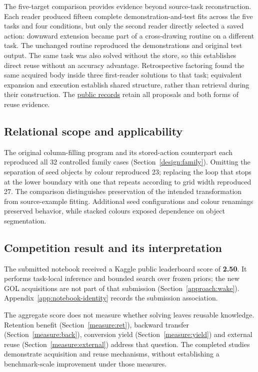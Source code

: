 \documentclass[11pt]{article}
\begin{document}
The five-target comparison provides evidence beyond source-task reconstruction. Each reader produced fifteen complete demonstration-and-test fits across the five tasks and four conditions, but only the second reader directly selected a saved action: downward extension became part of a cross-drawing routine on a different task. The unchanged routine reproduced the demonstrations and original test output. The same task was also solved without the store, so this establishes direct reuse without an accuracy advantage. Retrospective factoring found the same acquired body inside three first-reader solutions to that task; equivalent expansion and execution establish shared structure, rather than retrieval during their construction. The \href{https://github.com/lenyabloko/arc-gol-paper-replay}{public records} retain all proposals and both forms of reuse evidence.

\subsection{Relational scope and applicability}
The original column-filling program and its stored-action counterpart each reproduced all 32 controlled family cases (Section~\ref{design:family}). Omitting the separation of seed objects by colour reproduced 23; replacing the loop that stops at the lower boundary with one that repeats according to grid width reproduced 27. The comparison distinguishes preservation of the intended transformation from source-example fitting. Additional seed configurations and colour renamings preserved behavior, while stacked colours exposed dependence on object segmentation.

\subsection{Competition result and its interpretation}\label{results:competition}
The submitted notebook received a Kaggle public leaderboard score of \textbf{2.50}. It performs task-local inference and bounded search over frozen priors; the new GOL acquisitions are not part of that submission (Section~\ref{approach:wake}). Appendix~\ref{app:notebook-identity} records the submission association.

The aggregate score does not measure whether solving leaves reusable knowledge. Retention benefit (Section~\ref{measure:ret}), backward transfer (Section~\ref{measure:back}), conversion yield (Section~\ref{measure:yield}) and external reuse (Section~\ref{measure:external}) address that question. The completed studies demonstrate acquisition and reuse mechanisms, without establishing a benchmark-scale improvement under those measures.
\end{document}
